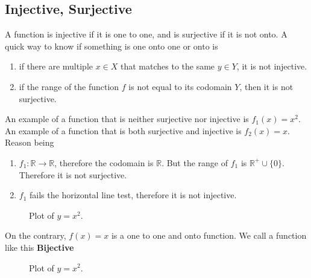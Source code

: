 \documentclass[12pt]{book}
\newcommand{\R}{\mathbb{R}}
\newcommand{\zero}{\{0\}}
\begin{document}
\subsection{Injective, Surjective}
    A function is injective if it is one to one, and is surjective if it is not onto. A quick way to know if something is one onto one or onto is
    \begin{enumerate}
        \item if there are multiple $x \in X$ that matches to the same $y \in Y$, it is not injective.
        \item if the range of the function $f$ is not equal to its codomain $Y$, then it is not surjective. 
    \end{enumerate}
    An example of a function that is neither surjective nor injective is $f_1(x) = x^2$. An example of a function that is both surjective and injective is $f_2(x) = x$. Reason being
    \begin{enumerate}
        \item $f_1 \colon \R \to \R$, therefore the codomain is $\R$. But the range of $f_1$ is $\R^+ \cup \zero$. Therefore it is not surjective.
        \item $f_1$ fails the horizontal line test, therefore it is not injective. 
    \end{enumerate}
    \begin{figure}[!h]
    \centering
    \caption{Plot of $y = x^2$.}
    \end{figure}
On the contrary, $f(x) = x$ is a one to one and onto function. We call a function like this \textbf{Bijective}



\begin{figure}[!h]
    \centering
    \caption{Plot of $y = x^2$.}
    \end{figure}
\end{document}

